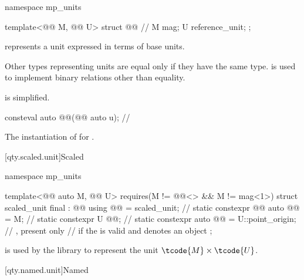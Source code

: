 \begin{codeblock}
namespace mp_units {

template<@@ M, @@ U>
struct @@ {  // \expos
  M mag;
  U reference_unit;
};

}
\end{codeblock}

\pnum
{} represents a unit expressed in terms of base units.
\begin{note}
Other types representing units are equal only if they have the same type.
 is used to implement binary relations other than equality.
\end{note}
 is simplified.

\begin{itemdecl}
consteval auto @@(@@ auto u);  // \expos
\end{itemdecl}

\begin{itemdescr}
\pnum
\returns
The instantiation of  for .
\end{itemdescr}

[qty.scaled.unit]{Scaled}

\begin{codeblock}
namespace mp_units {

template<@@ auto M, @@ U>
  requires(M != @@<>{} && M != mag<1>)
struct scaled_unit final : @@ {
  using @@ = scaled_unit;                         // \expos
  static constexpr @@ auto @@ = M;           // \expos
  static constexpr U @@{};                   // \expos
  static constexpr auto @@ = U::point_origin;  // \expos, present only
    // if the   is valid and denotes an object
};

}
\end{codeblock}

\pnum
{} is used by the library
to represent the unit $\tcode{M} \times \tcode{U}$.

[qty.named.unit]{Named}

